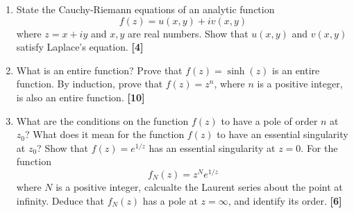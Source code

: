 \documentclass[a4paper]{article}
\begin{document}
\newpage
\begin{qns}\leavevmode
\begin{enumerate}[label=(\alph*)]
\item State the Cauchy-Riemann equations of an analytic function $$f(z)=u(x,y)+iv(x,y)$$ where $z=x+iy$ and $x,y$ are real numbers. Show that $u(x,y)$ and $v(x,y)$ satisfy Laplace's equation. \hfill \textbf{[4]}
\item What is an entire function? Prove that $f(z)=\sinh(z)$ is an entire function. By induction, prove that $f(z)=z^n$, where $n$ is a positive integer, is also an entire function. \hfill \textbf{[10]}
\item What are the conditions on the function $f(z)$ to have a pole of order $n$ at $z_0$? What does it mean for the function $f(z)$ to have an essential singularity at $z_0$? Show that $f(z)=e^{1/z}$ has an essential singularity at $z=0$. For the function $$f_N(z)=z^Ne^{1/z}$$ where $N$ is a positive integer, calcualte the Laurent series about the point at infinity. Deduce that $f_N(z)$ has a pole at $z=\infty$, and identify its order. \hfill \textbf{[6]}
\end{enumerate}
\end{qns}
\end{document}
